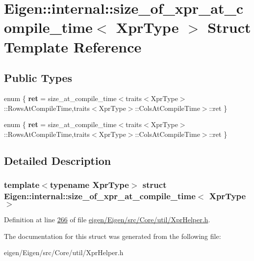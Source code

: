 \hypertarget{struct_eigen_1_1internal_1_1size__of__xpr__at__compile__time}{}\section{Eigen\+:\+:internal\+:\+:size\+\_\+of\+\_\+xpr\+\_\+at\+\_\+compile\+\_\+time$<$ Xpr\+Type $>$ Struct Template Reference}
\label{struct_eigen_1_1internal_1_1size__of__xpr__at__compile__time}
\subsection*{Public Types}
\begin{DoxyCompactItemize}
\item 
\mbox{\label{struct_eigen_1_1internal_1_1size__of__xpr__at__compile__time_a4f36974f479aaa3c59dff0ed3528faf8}} 
enum \{ {\bfseries ret} = size\+\_\+at\+\_\+compile\+\_\+time$<$traits$<$Xpr\+Type$>$\+:\+:Rows\+At\+Compile\+Time,traits$<$Xpr\+Type$>$\+:\+:Cols\+At\+Compile\+Time$>$\+:\+:ret
 \}
\item 
\mbox{\label{struct_eigen_1_1internal_1_1size__of__xpr__at__compile__time_a9338f6f2c1b5f385b7e6c2bb9c0726f2}} 
enum \{ {\bfseries ret} = size\+\_\+at\+\_\+compile\+\_\+time$<$traits$<$Xpr\+Type$>$\+:\+:Rows\+At\+Compile\+Time,traits$<$Xpr\+Type$>$\+:\+:Cols\+At\+Compile\+Time$>$\+:\+:ret
 \}
\end{DoxyCompactItemize}


\subsection{Detailed Description}
\subsubsection*{template$<$typename Xpr\+Type$>$\newline
struct Eigen\+::internal\+::size\+\_\+of\+\_\+xpr\+\_\+at\+\_\+compile\+\_\+time$<$ Xpr\+Type $>$}



Definition at line \hyperlink{eigen_2_eigen_2src_2_core_2util_2_xpr_helper_8h_source_l00266}{266} of file \hyperlink{eigen_2_eigen_2src_2_core_2util_2_xpr_helper_8h_source}{eigen/\+Eigen/src/\+Core/util/\+Xpr\+Helper.\+h}.



The documentation for this struct was generated from the following file\+:\begin{DoxyCompactItemize}
\item 
eigen/\+Eigen/src/\+Core/util/\+Xpr\+Helper.\+h\end{DoxyCompactItemize}
